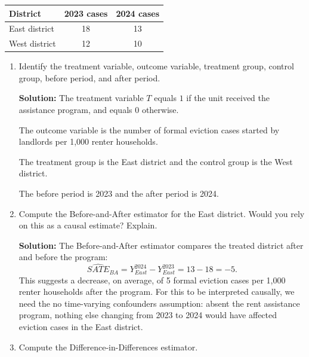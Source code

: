 \documentclass[11pt]{exam}
\begin{document}
\begin{questions}
\begin{center}
\begin{tabular}{lcc}
\toprule
District & 2023 cases & 2024 cases \\
\midrule
East district & 18 & 13 \\
West district & 12 & 10 \\
\bottomrule
\end{tabular}
\end{center}

\begin{enumerate}[leftmargin = 0.5cm, label = (\alph*), rightmargin = 0.2cm]
    \item Identify the treatment variable, outcome variable, treatment group, control group, before period, and after period.

    \begin{solutionorbox}[7.5cm]
    \textbf{Solution:} The treatment variable $T$ equals $1$ if the unit received the assistance program, and equals 0 otherwise.

    The outcome variable is the number of formal eviction cases started by landlords per 1,000 renter households.

    The treatment group is the East district and the control group is the West district.

    The before period is 2023 and the after period is 2024.
    \end{solutionorbox}

    \item Compute the Before-and-After estimator for the East district. Would you rely on this as a causal estimate? Explain.

    \begin{solutionorbox}[7cm]
    \textbf{Solution:} The Before-and-After estimator compares the treated district after and before the program:
    \[
    \widehat{SATE}_{BA}=Y^{2024}_{East}-Y^{2023}_{East}=13-18=-5.
    \]
    This suggests a decrease, on average, of 5 formal eviction cases per 1,000 renter households after the program. For this to be interpreted causally, we need the no time-varying confounders assumption: absent the rent assistance program, nothing else changing from 2023 to 2024 would have affected eviction cases in the East district.
    \end{solutionorbox}

    \item Compute the Difference-in-Differences estimator.

    \begin{solutionorbox}[3.5cm]


\end{solutionorbox}
\end{enumerate}
\end{questions}
\end{document}
